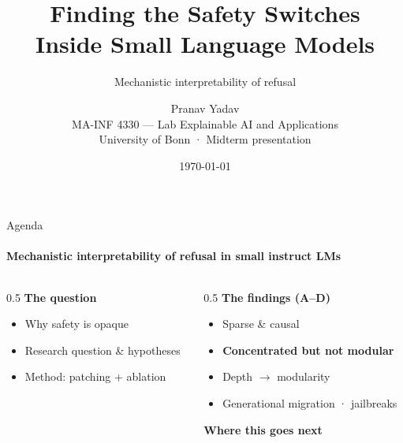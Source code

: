 \documentclass[aspectratio=169]{beamer}
\title[Safety Switches]{Finding the Safety Switches\\[4pt]{\normalsize\mdseries Inside Small Language Models}}
\subtitle{Mechanistic interpretability of refusal}
\author[Pranav Yadav]{Pranav Yadav\\[2pt]{\small MA-INF 4330 — Lab Explainable AI and Applications}\\{\small University of Bonn · Midterm presentation}}
\date{\today}
\newcommand{\hl}[1]{\textcolor{themeblue}{\textbf{#1}}}
\begin{document}
\begin{frame}[plain]
  \titlepage
\end{frame}

\begin{frame}{Agenda}
  \framesubtitle{Mechanistic interpretability of refusal in small instruct LMs}
  \begin{columns}[T]
    \begin{column}{0.5\textwidth}
      \textbf{The question}
      \begin{itemize}
        \item Why safety is opaque
        \item Research question \& hypotheses
        \item Method: patching + ablation
      \end{itemize}
    \end{column}
    \begin{column}{0.5\textwidth}
      \textbf{The findings (A--D)}
      \begin{itemize}
        \item Sparse \& causal
        \item \hl{Concentrated but not modular}
        \item Depth $\rightarrow$ modularity
        \item Generational migration · jailbreaks
      \end{itemize}
      \vspace{4pt}
      \textbf{Where this goes next}
    \end{column}
  \end{columns}
\end{frame}
\end{document}

